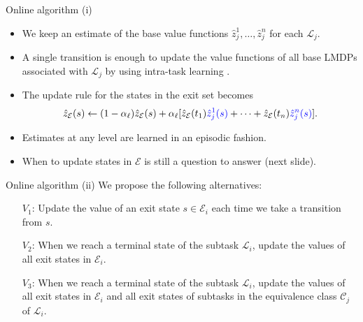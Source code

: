\documentclass{beamer}
\theoremstyle{mystyle}
\newcommand{\cC}{\mathcal{C}}
\newcommand{\cE}{\mathcal{E}}
\newcommand{\cL}{\mathcal{L}}
\begin{document}
\begin{frame}{Online algorithm (i)}

\begin{itemize}
    
    \item We keep an estimate of the base value functions $\hat{z}_j^1,\ldots,\hat{z}_j^n$ for each $\cL_j$.
    \item A single transition is enough to update the value functions of all base LMDPs associated with  $\cL_j$ by using intra-task learning \cite{Kaelbling93}.
    \item The update rule for the states in the exit set becomes
    \[
        \hat{z}_\cE(s) \leftarrow (1 - \alpha_\ell) \hat{z}_\cE(s) + \alpha_\ell [\hat{z}_\cE(t_1) {\color{blue}\hat{z}_j^1(s)} + \cdots + \hat{z}_\cE(t_n) {\color{blue} \hat{z}_j^n(s)}].
    \]
    \item Estimates at any level are learned in an episodic fashion.
    \item When to update states in $\cE$ is still a question to answer (next slide).
\end{itemize}
    
\end{frame}


\begin{frame}{Online algorithm (ii)}
We propose the following alternatives:
\begin{itemize}
\item[$V_1$:] Update the value of an exit state $s\in\cE_i$ each time we take a transition from $s$.
\item[$V_2$:] When we reach a terminal state of the subtask $\cL_i$, update the values of all exit states in $\cE_i$.
\item[$V_3$:] When we reach a terminal state of the subtask $\cL_i$, update the values of all exit states in $\cE_i$ and all exit states of subtasks in the equivalence class $\cC_j$ of $\cL_i$.
\end{itemize}


    
\end{frame}
\end{document}
